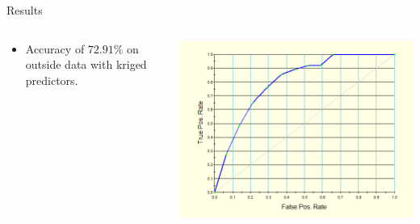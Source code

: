 \documentclass[10pt]{beamer}
\begin{document}
\begin{frame}{Results}
    \begin{columns}[T]
        \begin{column}{.35 \textwidth}
            \begin{itemize}
                \item Accuracy of $72.91\%$ on outside data with kriged predictors.
            \end{itemize}   
        \end{column}
        
        \begin{column}{.65\textwidth}
        \begin{center}
            \includegraphics[width = \textwidth]{ROCcurveKriged.png}
        \end{center}
        \end{column}
    \end{columns}
    \end{frame}
\end{document}
